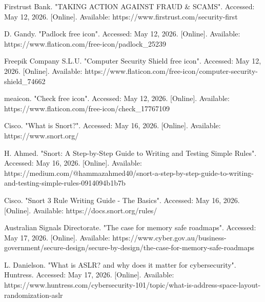 \documentclass[titlepage]{article}
\begin{document}
    \vspace{0.5em}

    Firstrust Bank. "TAKING ACTION AGAINST FRAUD \& SCAMS". Accessed: May
    12, 2026. [Online]. Available:
    https://www.firstrust.com/security-first

    \vspace{0.5em}

    D. Gandy. "Padlock free icon". Accessed: May 12, 2026. [Online].
    Available: https://www.flaticon.com/free-icon/padlock\_25239

    \vspace{0.5em}

    Freepik Company S.L.U. "Computer Security Shield free icon". Accessed:
    May 12, 2026. [Online]. Available:
    https://www.flaticon.com/free-icon/computer-security-shield\_74662

    \vspace{0.5em}

    meaicon. "Check free icon". Accessed: May 12, 2026. [Online].
    Available: https://www.flaticon.com/free-icon/check\_17767109

    \vspace{0.5em}

    Cisco. "What is Snort?". Accessed: May 16, 2026. [Online].
    Available: https://www.snort.org/

    \vspace{0.5em}

    H. Ahmed. "Snort: A Step-by-Step Guide to Writing and Testing Simple
    Rules". Accessed: May 16, 2026. [Online]. Available:
    https://medium.com/@hammazahmed40/snort-a-step-by-step-guide-to-writing-and-testing-simple-rules-0914094b1b7b

    \vspace{0.5em}

    Cisco. "Snort 3 Rule Writing Guide - The Basics". Accessed: May 16,
    2026. [Online]. Available: https://docs.snort.org/rules/

    \vspace{0.5em}

    Australian Signals Directorate. "The case for memory safe roadmaps".
    Accessed: May 17, 2026. [Online]. Available:
    https://www.cyber.gov.au/business-government/secure-design/secure-by-design/the-case-for-memory-safe-roadmaps

    \vspace{0.5em}

    L. Danielson. "What is ASLR? and why does it matter for
    cybersecurity". Huntress. Accessed: May 17, 2026. [Online].
    Available:
    https://www.huntress.com/cybersecurity-101/topic/what-is-address-space-layout-randomization-aslr
\end{document}
